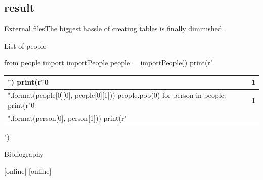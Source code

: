 \documentclass[
aspectratio=1610,
hyperref={pdfpagemode=FullScreen},
english,
usenames,
dvipsnames
]
{beamer} %
\begin{document}
\subsection{result}
\begin{frame}[fragile]{External files}{The biggest hassle of creating tables is finally diminished.}
\begin{exampleblock}{List of people}
\begin{pycode}[people]
from people import importPeople
people = importPeople()	
print(r"\begin{tabular}{ l | r }")
print(r"{0} & {1} \\ \hline".format(people[0][0], people[0][1]))
people.pop(0)
for person in people:
	print(r"{0} & {1} \\".format(person[0], person[1]))
print(r"\end{tabular}")
\end{pycode}
\end{exampleblock}

\onslide
\end{frame}

\appendix
\begin{frame}[allowframebreaks]{Bibliography}
  \begin{thebibliography}{9}
    [online]
      [online]
  \end{thebibliography}
\end{frame}
\end{document}
